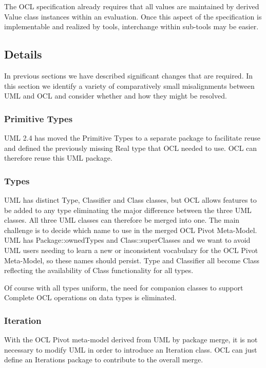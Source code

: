 \documentclass{eceasst}
\begin{document}
The OCL specification already requires that all values are maintained by derived Value class instances within an evaluation. Once this aspect of the specification is implementable and realized by tools, interchange within sub-tools may be easier.

\subsection{Details}

In previous sections we have described significant changes that are required. In this section we identify a variety of comparatively small misalignments between UML and OCL and consider whether and how they might be resolved.

\subsubsection{Primitive Types}

UML 2.4 has moved the Primitive Types to a separate package to facilitate reuse and defined the previously missing Real type that OCL needed to use. OCL can therefore reuse this UML package.

\subsubsection{Types}\label{Type}

UML has distinct Type, Classifier and Class classes, but OCL allows features to be added to any type eliminating the major difference between the three UML classes. All three UML classes can therefore be merged into one. The main challenge is to decide which name to use in the merged OCL Pivot Meta-Model. UML has Package::ownedTypes and Class::superClasses and we want to avoid UML users needing to learn a new or inconsistent vocabulary for the OCL Pivot Meta-Model, so these names should persist. Type and Classifier all become Class reflecting the availability of Class functionality for all types.

Of course with all types uniform, the need for companion classes to support Complete OCL operations on data types is eliminated.

\subsubsection{Iteration}

With the OCL Pivot meta-model derived from UML by package merge, it is not necessary to modify UML in order to introduce an Iteration class. OCL can just define an Iterations package to contribute to the overall merge.
\end{document}
